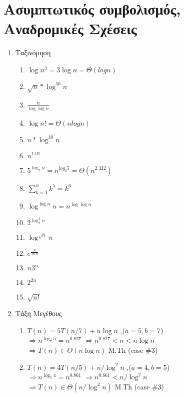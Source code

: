 \documentclass[a4paper,10pt]{article} \usepackage{anysize}
\newcommand{\tab}{\hspace*{3em}}
\begin{document}
\renewcommand{\labelenumi}{\roman{enumi})}
\renewcommand{\labelenumii}{(\arabic{enumii})}



\section{Ασυμπτωτικός συμβολισμός, Αναδρομικές
Σχέσεις} \setcounter{section}{1}
\begin{enumerate}

\item Ταξινόμηση
\begin{enumerate}
\item $\log {n^3} = 3 \log{n} = \Theta(logn)$
\item $\sqrt{n}*\log^{50}{n} $
\item $\frac{n}{\log{\log{n}} } $
\item $\log{n!} = \Theta (nlog{n})$
\item $n*\log^{10}{n} $
\item $n^{1.01} $
\item $5^{\log_{2}{n}} = n^{log_{2}{5}} = \Theta (n^{2.322}) $
\item $\sum_{k=1}^n{k^5} = {k^6}$
\item $\log^{\log{n}}{n} = n^{\log{\log{n}} } $
\item $2^{\log_2^4{n}} $
\item $\log^{\sqrt{n}}{n} $
\item $e^{\frac{n}{\ln{n}} } $
\item $n3^n $
\item $2^{2n} $
\item $\sqrt{n!} $
\end{enumerate}

\item Τάξη Μεγέθους
\begin{enumerate}
\item $T(n)=5T(n/7)+n\log{n}$ ,\tab ($a=5 , b=7$) \\
$\Rightarrow n^{\log _7 {5}} = n^{0.827}$
$\Rightarrow n^{0.827} < n < n\log{n}$\\
$\Rightarrow T(n) \in \Theta(n\log{n})$ \tab M.Th (case \#3)\\


\item $T(n) = 4T(n/5)+n/\log^2{n}$ ,\tab ($a=4 , b=5$)\\
$\Rightarrow n^{\log_5 {4}} = n^{0.861}$
$\Rightarrow n^{0.861} < n/\log^2{n}$\\
$\Rightarrow T(n) \in \Theta(n/\log^2{n})$ \tab M.Th (case \#3)\\


\end{enumerate}
\end{enumerate}
\end{document}
